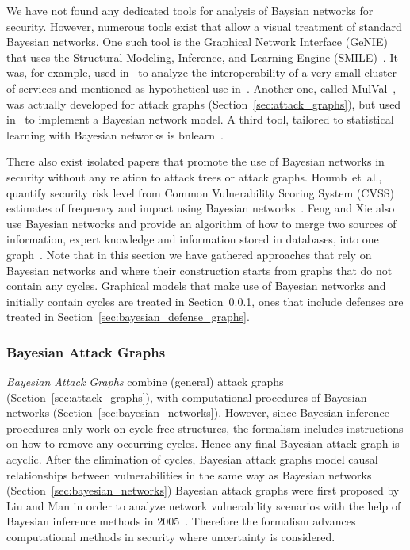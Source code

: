 \documentclass[a4paper]{article}
\begin{document}
We have not found any dedicated tools for analysis of Baysian networks for 
security. However, numerous tools exist that allow a visual treatment of 
standard Bayesian networks. One such tool is the Graphical Network Interface
(GeNIE) that uses the Structural Modeling, Inference, and Learning Engine
(SMILE)~\cite{Website_Genie}. It was, for example, used in~\cite{NaJoLaFrEk} to
analyze the interoperability of a very small cluster of services and mentioned
as hypothetical use in~\cite{FrSoEkJo}. Another one, called
MulVal~\cite{OuGoAp}, was actually developed for attack graphs 
(Section~\ref{sec:attack_graphs}), but used in~\cite{XiLiOuLiLe} to implement a
Bayesian network model. A third tool, tailored to statistical learning with 
Bayesian networks is bnlearn~\cite{Scut}.

There also exist isolated papers that promote the use of Bayesian networks in
security without any relation to attack trees or attack graphs. Houmb~et~al.,
quantify security risk level from Common Vulnerability Scoring System (CVSS)
estimates of frequency and impact using Bayesian networks~\cite{HoFrEn}. Feng
and Xie also use Bayesian networks and provide an algorithm of how to merge two
sources of information, expert knowledge and information stored in databases,
into one graph~\cite{FeXi}. Note that in this section we have gathered
approaches that rely on Bayesian networks and where their construction starts
from graphs that do not contain any cycles. Graphical models that make use of
Bayesian networks and initially contain cycles are treated in
Section~\ref{sec:bayesian_attack_graphs}, ones that include defenses are treated
in Section~\ref{sec:bayesian_defense_graphs}.

\subsubsection{Bayesian Attack Graphs} 
\label{sec:bayesian_attack_graphs}

\emph{Bayesian Attack Graphs} combine (general) attack graphs
(Section~\ref{sec:attack_graphs}), with computational procedures of Bayesian
networks (Section~\ref{sec:bayesian_networks}). However, since Bayesian
inference procedures only work on cycle-free structures, the formalism includes
instructions on how to remove any occurring cycles. Hence any final Bayesian
attack graph is acyclic. After the elimination of cycles, Bayesian attack graphs
model causal relationships between vulnerabilities in the same way as Bayesian
networks (Section~\ref{sec:bayesian_networks}) Bayesian attack graphs were first
proposed by Liu and Man in order to analyze network vulnerability scenarios with
the help of Bayesian inference methods in $2005$~\cite{LiMa}. Therefore the
formalism advances computational methods in security where uncertainty is
considered.
\end{document}
